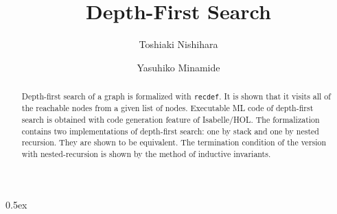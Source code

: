 \documentclass[11pt,a4paper]{article}
\begin{document}
\title{Depth-First Search}
\author{Toshiaki Nishihara \and Yasuhiko Minamide}
\maketitle

\begin{abstract}
  Depth-first search of a graph is formalized with \texttt{recdef}. 
  It is shown that it visits all of the reachable nodes from a given list of 
  nodes. Executable ML code of depth-first search is obtained with code 
  generation feature of Isabelle/HOL.
  The formalization contains two implementations of depth-first search: 
  one by stack and one by nested recursion. They are shown to be equivalent. 
  The termination condition of the version with nested-recursion is shown 
  by the method of inductive invariants.
\end{abstract}

\tableofcontents

\parindent 0pt\parskip 0.5ex


\end{document}
